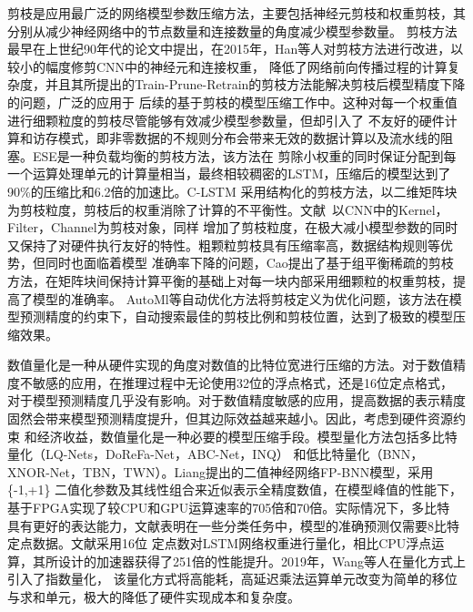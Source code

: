 剪枝是应用最广泛的网络模型参数压缩方法，主要包括神经元剪枝和权重剪枝，其分别从减少神经网络中的节点数量和连接数量的角度减少模型参数量。
剪枝方法最早在上世纪90年代的论文中提出，在2015年，Han等人对剪枝方法进行改进，以较小的幅度修剪CNN中的神经元和连接权重，
降低了网络前向传播过程的计算复杂度，并且其所提出的Train-Prune-Retrain的剪枝方法能解决剪枝后模型精度下降的问题，广泛的应用于
后续的基于剪枝的模型压缩工作中。这种对每一个权重值进行细颗粒度的剪枝尽管能够有效减少模型参数量，但却引入了
不友好的硬件计算和访存模式，即非零数据的不规则分布会带来无效的数据计算以及流水线的阻塞。ESE是一种负载均衡的剪枝方法，该方法在
剪除小权重的同时保证分配到每一个运算处理单元的计算量相当，最终相较稠密的LSTM，压缩后的模型达到了90\%的压缩比和6.2倍的加速比。C-LSTM
采用结构化的剪枝方法，以二维矩阵块为剪枝粒度，剪枝后的权重消除了计算的不平衡性。文献~\cite{Hao:ICLR'17, He:ICCV'17, Zhuang:NIPS'18, Anwar:AJETCS'17, He:IJCAI'18}以CNN中的Kernel，Filter，Channel为剪枝对象，同样
增加了剪枝粒度，在极大减小模型参数的同时又保持了对硬件执行友好的特性。粗颗粒剪枝具有压缩率高，数据结构规则等优势，但同时也面临着模型
准确率下降的问题，Cao提出了基于组平衡稀疏的剪枝方法，在矩阵块间保持计算平衡的基础上对每一块内部采用细颗粒的权重剪枝，提高了模型的准确率。
AutoMl等自动优化方法将剪枝定义为优化问题，该方法在模型预测精度的约束下，自动搜索最佳的剪枝比例和剪枝位置，达到了极致的模型压缩效果。

数值量化是一种从硬件实现的角度对数值的比特位宽进行压缩的方法。对于数值精度不敏感的应用，在推理过程中无论使用32位的浮点格式，还是16位定点格式，
对于模型预测精度几乎没有影响。对于数值精度敏感的应用，提高数据的表示精度固然会带来模型预测精度提升，但其边际效益越来越小。因此，考虑到硬件资源约束
和经济收益，数值量化是一种必要的模型压缩手段。模型量化方法包括多比特量化（LQ-Nets，DoReFa-Net，ABC-Net，INQ）
和低比特量化（BNN，XNOR-Net，TBN，TWN）。Liang提出的二值神经网络FP-BNN模型，采用\{-1,+1\}
二值化参数及其线性组合来近似表示全精度数值，在模型峰值的性能下，基于FPGA实现了较CPU和GPU运算速率的705倍和70倍。实际情况下，多比特
具有更好的表达能力，文献表明在一些分类任务中，模型的准确预测仅需要8比特定点数据。文献采用16位
定点数对LSTM网络权重进行量化，相比CPU浮点运算，其所设计的加速器获得了251倍的性能提升。2019年，Wang等人在量化方式上引入了指数量化，
该量化方式将高能耗，高延迟乘法运算单元改变为简单的移位与求和单元，极大的降低了硬件实现成本和复杂度。

